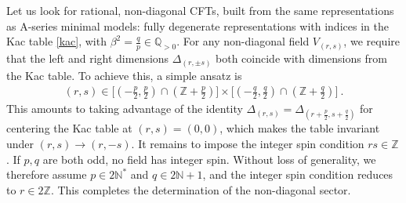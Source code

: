 \documentclass[12pt, a4paper]{article}
\begin{document}
Let us look for rational, non-diagonal CFTs, built from the same representations as A-series minimal models: fully degenerate representations with indices in the Kac table \eqref{kac}, with $\beta^2=\frac{q}{p}\in\mathbb{Q}_{>0}$. For any non-diagonal field $V_{(r,s)}$, we require that the left and right dimensions $\Delta_{(r,\pm s)}$ both coincide with dimensions from the Kac table. To achieve this, a simple ansatz is 
\begin{align}
 (r,s) \in \Big[\left(-\tfrac{p}{2},\tfrac{p}{2}\right) \cap \left(\mathbb{Z}+\tfrac{p}{2}\right)\Big] \times \Big[\left(-\tfrac{q}{2},\tfrac{q}{2}\right) \cap \left(\mathbb{Z}+\tfrac{q}{2}\right)\Big] \ . 
\end{align}
This amounts to taking advantage of the identity $\Delta_{(r,s)}=\Delta_{(r+\frac{p}{2},s+\frac{q}{2})}$ for centering the Kac table at $(r,s)=(0,0)$, which makes the table invariant under $(r,s)\to (r,-s)$. It remains to impose the integer spin condition $rs\in\mathbb{Z}$. If $p,q$ are both odd, no field has integer spin. Without loss of generality, we therefore assume $p\in 2\mathbb{N}^*$ and $q\in 2\mathbb{N}+1$, 
and the integer spin condition reduces to $r\in 2\mathbb{Z}$. This completes the determination of the non-diagonal sector. 
\end{document}
